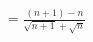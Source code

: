 \documentclass[preview]{standalone}
\begin{document}
\begin{align*}
= \frac{ (n+1) - n }{ \sqrt{n+1} + \sqrt{n} }
\end{align*}
\end{document}
